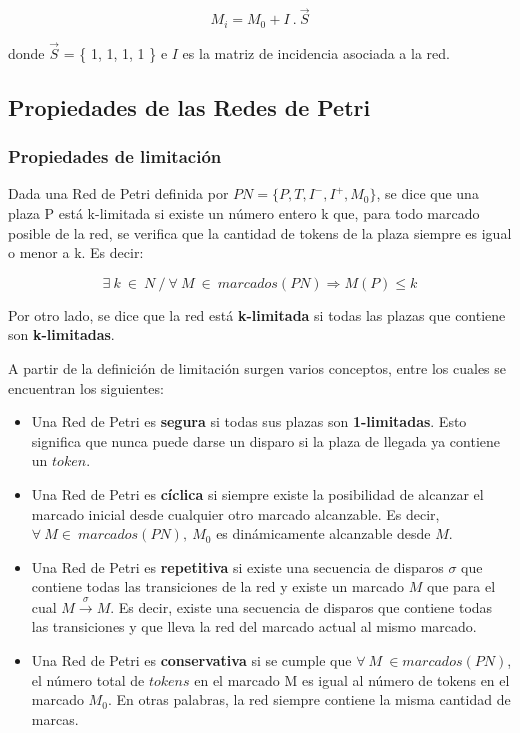 \begin{equation}
    M_i = M_0 + I \ . \ \vec{S}
\end{equation}

\noindent donde $\vec{S}$ = \{ 1, 1, 1, 1 \} e $I$ es la matriz de incidencia asociada a la red.

\subsection{Propiedades de las Redes de Petri}
\subsubsection{Propiedades de limitación}
Dada una Red de Petri definida por $PN = \{ P, T, I^-, I^+, M_0 \}$, se dice que una plaza P está k-limitada si existe un número entero k que, para todo marcado posible de la red, se verifica que la cantidad de tokens de la plaza siempre es igual o menor a k. Es decir:

\begin{equation}
    \exists \ k \ \in \ N \ / \ \forall \ M \ \in \ marcados (PN) \Rightarrow M(P) \leq k
\end{equation}

\noindent Por otro lado, se dice que la red está \textbf{k-limitada} si todas las plazas que contiene son \textbf{k-limitadas}. \\ \par

A partir de la definición de limitación surgen varios conceptos, entre los cuales se encuentran los siguientes:
\begin{itemize}
    \item Una Red de Petri es \textbf{segura} si todas sus plazas son \textbf{1-limitadas}. Esto significa que nunca puede darse un disparo si la plaza de llegada ya contiene un $token$.
    \item Una Red de Petri es \textbf{cíclica} si siempre existe la posibilidad de alcanzar el marcado inicial desde cualquier otro marcado alcanzable. Es decir, \break $\forall \ M  \in \ marcados(PN),\ M_0$ es dinámicamente alcanzable desde $M$.
    \item Una Red de Petri es \textbf{repetitiva} si existe una secuencia de disparos $\sigma$ que contiene todas las transiciones de la red y existe un marcado $M$ que para el cual $M \xrightarrow{\sigma} M$. Es decir, existe una secuencia de disparos que contiene todas las transiciones y que lleva la red del marcado actual al mismo marcado.
    \item  Una Red de Petri es \textbf{conservativa} si se cumple que $\forall \ M\ \in marcados (PN)$, el número total de $tokens$ en el marcado M es igual al número de tokens en el marcado $M_0$. En otras palabras, la red siempre contiene la misma cantidad de marcas.
\end{itemize}

